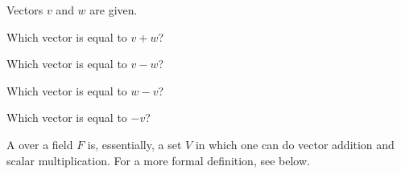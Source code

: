 \endedxtext






Vectors $v$ and $w$ are given.  

\begin{center}

\end{center}

Which vector is equal to $v+w$?    



Which vector is equal to $v-w$?    


Which vector is equal to $w-v$?    


Which vector is equal to $-v$?    


\edXsolution{  }

\endedxproblem


\endedxvertical




\endedxvertical




A {} over a field $F$ is, essentially, a set $V$ in which one can 
do vector addition and scalar multiplication.  For a more formal definition, see below. 





